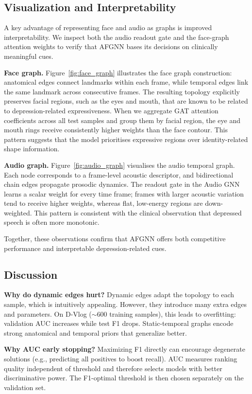 \documentclass[conference]{IEEEtran}
\begin{document}
\subsection{Visualization and Interpretability}

A key advantage of representing face and audio as graphs is improved interpretability.
We inspect both the audio readout gate and the face-graph attention weights to verify that AFGNN bases its decisions on clinically meaningful cues.

\textbf{Face graph.}
Figure~\ref{fig:face_graph} illustrates the face graph construction: anatomical edges connect landmarks within each frame, while temporal edges link the same landmark across consecutive frames.
The resulting topology explicitly preserves facial regions, such as the eyes and mouth, that are known to be related to depression-related expressiveness.
When we aggregate GAT attention coefficients across all test samples and group them by facial region, the eye and mouth rings receive consistently higher weights than the face contour.
This pattern suggests that the model prioritises expressive regions over identity-related shape information.

\textbf{Audio graph.}
Figure~\ref{fig:audio_graph} visualises the audio temporal graph.
Each node corresponds to a frame-level acoustic descriptor, and bidirectional chain edges propagate prosodic dynamics.
The readout gate in the Audio GNN learns a scalar weight for every time frame; frames with larger acoustic variation tend to receive higher weights, whereas flat, low-energy regions are down-weighted.
This pattern is consistent with the clinical observation that depressed speech is often more monotonic.

Together, these observations confirm that AFGNN offers both competitive performance and interpretable depression-related cues.

\subsection{Discussion}

\textbf{Why do dynamic edges hurt?}
Dynamic edges adapt the topology to each sample, which is intuitively appealing.
However, they introduce many extra edges and parameters.
On D-Vlog ($\sim$600 training samples), this leads to overfitting: validation AUC increases while test F1 drops.
Static-temporal graphs encode strong anatomical and temporal priors that generalize better.

\textbf{Why AUC early stopping?}
Maximizing F1 directly can encourage degenerate solutions (e.g., predicting all positives to boost recall).
AUC measures ranking quality independent of threshold and therefore selects models with better discriminative power.
The F1-optimal threshold is then chosen separately on the validation set.
\end{document}
